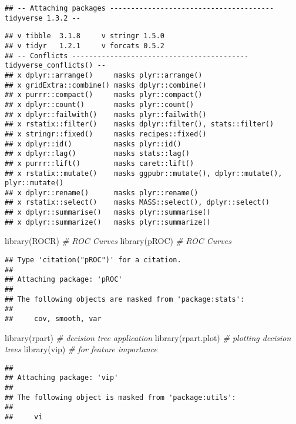 \documentclass[
]{article}
\newenvironment{Shaded}{\begin{snugshade}}{\end{snugshade}}
\newcommand{\CommentTok}[1]{\textcolor[rgb]{0.56,0.35,0.01}{\textit{#1}}}
\newcommand{\FunctionTok}[1]{\textcolor[rgb]{0.00,0.00,0.00}{#1}}
\newcommand{\NormalTok}[1]{#1}
\begin{document}
\begin{verbatim}
## -- Attaching packages --------------------------------------- tidyverse 1.3.2 --
\end{verbatim}

\begin{verbatim}
## v tibble  3.1.8     v stringr 1.5.0
## v tidyr   1.2.1     v forcats 0.5.2
## -- Conflicts ------------------------------------------ tidyverse_conflicts() --
## x dplyr::arrange()     masks plyr::arrange()
## x gridExtra::combine() masks dplyr::combine()
## x purrr::compact()     masks plyr::compact()
## x dplyr::count()       masks plyr::count()
## x dplyr::failwith()    masks plyr::failwith()
## x rstatix::filter()    masks dplyr::filter(), stats::filter()
## x stringr::fixed()     masks recipes::fixed()
## x dplyr::id()          masks plyr::id()
## x dplyr::lag()         masks stats::lag()
## x purrr::lift()        masks caret::lift()
## x rstatix::mutate()    masks ggpubr::mutate(), dplyr::mutate(), plyr::mutate()
## x dplyr::rename()      masks plyr::rename()
## x rstatix::select()    masks MASS::select(), dplyr::select()
## x dplyr::summarise()   masks plyr::summarise()
## x dplyr::summarize()   masks plyr::summarize()
\end{verbatim}

\begin{Shaded}
\begin{Highlighting}[]
\FunctionTok{library}\NormalTok{(ROCR)      }\CommentTok{\# ROC Curves}
\FunctionTok{library}\NormalTok{(pROC)      }\CommentTok{\# ROC Curves}
\end{Highlighting}
\end{Shaded}

\begin{verbatim}
## Type 'citation("pROC")' for a citation.
## 
## Attaching package: 'pROC'
## 
## The following objects are masked from 'package:stats':
## 
##     cov, smooth, var
\end{verbatim}

\begin{Shaded}
\begin{Highlighting}[]
\FunctionTok{library}\NormalTok{(rpart)      }\CommentTok{\# decision tree application}
\FunctionTok{library}\NormalTok{(rpart.plot)  }\CommentTok{\# plotting decision trees}
\FunctionTok{library}\NormalTok{(vip)         }\CommentTok{\# for feature importance}
\end{Highlighting}
\end{Shaded}

\begin{verbatim}
## 
## Attaching package: 'vip'
## 
## The following object is masked from 'package:utils':
## 
##     vi
\end{verbatim}
\end{document}
